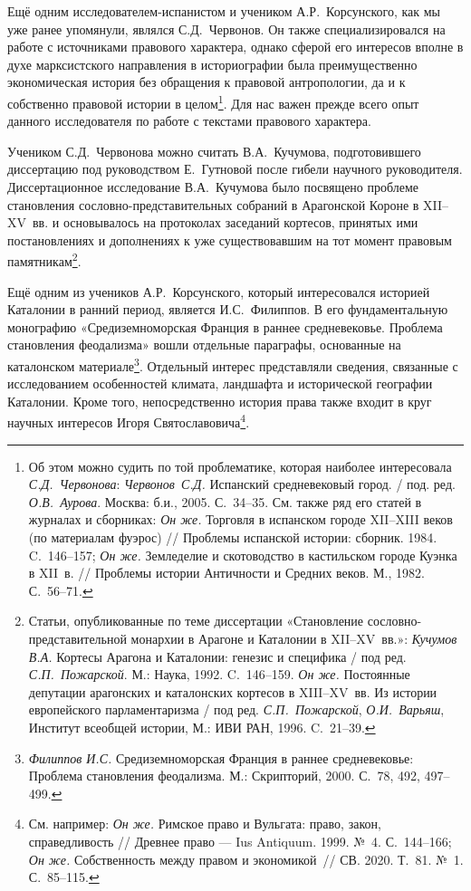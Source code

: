 Ещё одним исследователем-испанистом и учеником А.Р.~Корсунского, как мы уже ранее упомянули, являлся С.Д.~Червонов. Он также специализировался на работе с источниками правового характера, однако сферой его интересов вполне в духе марксистского направления в историографии была преимущественно экономическая история без обращения к правовой антропологии, да и к собственно правовой истории в целом\footnote{Об этом можно судить по той проблематике, которая наиболее интересовала \emph{С.Д.~Червонова}: \emph{Червонов}\emph{~С.Д.} Испанский средневековый город. / под. ред. \emph{О.В.~Аурова}. Москва: б.и., 2005. С.~34--35. См. также ряд его статей в журналах и сборниках: \emph{Он же.} Торговля в испанском городе XII--XIII веков (по материалам фуэрос) // Проблемы испанской истории: сборник. 1984. C.~146--157; \emph{Он же.} Земледелие и скотоводство в кастильском городе Куэнка в XII~в. // Проблемы истории Античности и Средних веков. М., 1982. С.~56--71.}. Для нас важен прежде всего опыт данного исследователя по работе с текстами правового характера.

Учеником С.Д.~Червонова можно считать В.А.~Кучумова, подготовившего диссертацию под руководством Е.~Гутновой после гибели научного руководителя. Диссертационное исследование В.А.~Кучумова было посвящено проблеме становления сословно-представительных собраний в Арагонской Короне в XII--XV~вв. и основывалось на протоколах заседаний кортесов, принятых ими постановлениях и дополнениях к уже существовавшим на тот момент правовым памятникам\footnote{Статьи, опубликованные по теме диссертации «Становление сословно-представительной монархии в Арагоне и Каталонии в XII--XV~вв.»: \emph{Кучумов В.А.} Кортесы Арагона и Каталонии: генезис и специфика / под ред. \emph{С.П.~Пожарской}. М.: Наука, 1992. C.~146--159. \emph{Он же.} Постоянные депутации арагонских и каталонских кортесов в XIII--XV~вв. Из истории европейского парламентаризма / под ред. \emph{С.П.~Пожарской}, \emph{О.И.~Варьяш}, Институт всеобщей истории, М.: ИВИ РАН, 1996. C.~21--39.}.

Ещё одним из учеников А.Р.~Корсунского, который интересовался историей Каталонии в ранний период, является И.С.~Филиппов. В его фундаментальную монографию «Средиземноморская Франция в раннее средневековье. Проблема становления феодализма» вошли отдельные параграфы, основанные на каталонском материале\footnote{\emph{Филиппов И.С.} Средиземноморская Франция в раннее средневековье: Проблема становления феодализма. М.: Скрипторий, 2000. С.~78, 492, 497--499.}. Отдельный интерес представляли сведения, связанные с исследованием особенностей климата, ландшафта и исторической географии Каталонии. Кроме того, непосредственно история права также входит в круг научных интересов Игоря Святославовича\footnote{См. например: \emph{Он же.} Римское право и Вульгата: право, закон, справедливость // Древнее право --- Ius Antiquum. 1999. №~4. С.~144--166; \emph{Он же.} Собственность между правом и экономикой~// СВ. 2020. Т.~81. №~1. С.~85--115.}.

